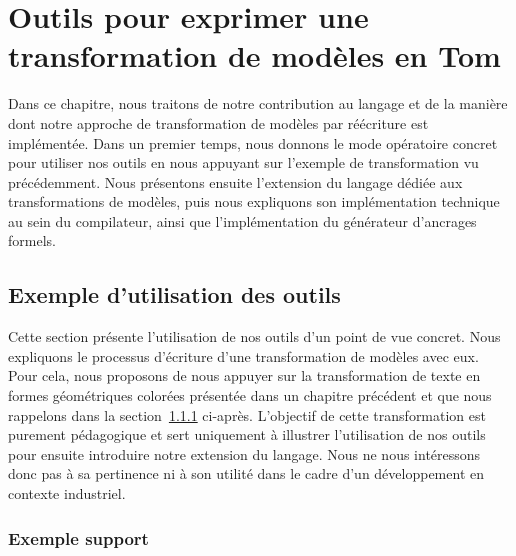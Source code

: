 \chapter{Outils pour exprimer une transformation de modèles en Tom}
\label{ch:outils}

Dans ce chapitre, nous traitons de notre contribution au langage {\tom} et de
la manière dont notre approche de transformation de modèles par réécriture est
implémentée. Dans un premier temps, nous donnons le mode opératoire concret
pour utiliser nos outils en nous appuyant sur l'exemple de transformation vu
précédemment. Nous présentons ensuite l'extension du langage {\tom} dédiée aux
transformations de modèles, puis nous expliquons son implémentation technique
au sein du compilateur, ainsi que l'implémentation du générateur d'ancrages
formels.


\section{Exemple d'utilisation des outils}


Cette section présente l'utilisation de nos outils d'un point de vue concret.
Nous expliquons le processus d'écriture d'une transformation de modèles avec
eux. Pour cela, nous proposons de nous appuyer sur la transformation de texte
en formes géométriques colorées présentée dans un chapitre précédent et que
nous rappelons dans la section~\ref{ch:outils:subsec:ex} ci-après. L'objectif
de cette transformation est purement pédagogique et sert uniquement à illustrer
l'utilisation de nos outils pour ensuite introduire notre extension du langage.
Nous ne nous intéressons donc pas à sa pertinence ni à son utilité dans le
cadre d'un développement en contexte industriel.

\subsection{Exemple support}
\label{ch:outils:subsec:ex}

